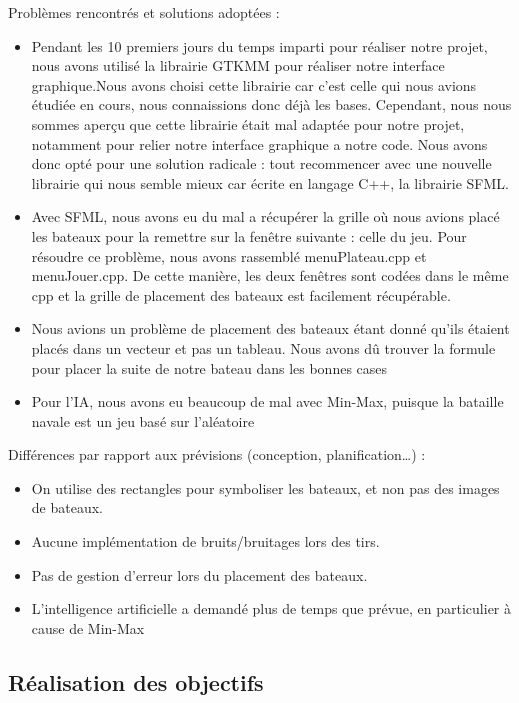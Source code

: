 \documentclass[a4paper,oneside]{article}
\begin{document}
Problèmes rencontrés et solutions adoptées :
\begin{itemize}

\item Pendant les 10 premiers jours du temps imparti pour réaliser notre projet, nous avons utilisé la librairie GTKMM pour réaliser notre interface graphique.Nous avons choisi cette librairie car c'est celle qui nous avions étudiée en cours, nous connaissions donc déjà les bases. Cependant, nous nous sommes aperçu que cette librairie était mal adaptée pour notre projet, notamment pour relier notre interface graphique a notre code. Nous avons donc opté pour une solution radicale : tout recommencer avec une nouvelle librairie qui nous semble mieux car écrite en langage C++, la librairie SFML.
\item Avec SFML, nous avons eu du mal a récupérer la grille où nous avions placé les bateaux pour la remettre sur la fenêtre suivante : celle du jeu. Pour résoudre ce problème, nous avons rassemblé menuPlateau.cpp et menuJouer.cpp. De cette manière, les deux fenêtres sont codées dans le même cpp et la grille de placement des bateaux est facilement récupérable.
\item Nous avions un problème de placement des bateaux étant donné qu'ils étaient placés dans un vecteur et pas un tableau. Nous avons dû trouver la formule pour placer la suite de notre bateau dans les bonnes cases
\item Pour l'IA, nous avons eu beaucoup de mal avec Min-Max, puisque la bataille navale est un jeu basé sur l'aléatoire
\newline
\\
\end{itemize}

Différences par rapport aux prévisions (conception, planification…) :
\begin{itemize}
	\item On utilise des rectangles pour symboliser les bateaux, et non pas des images de bateaux.
	\item Aucune implémentation de bruits/bruitages lors des tirs.
	\item Pas de gestion d'erreur lors du placement des bateaux.
	\item L'intelligence artificielle a demandé plus de temps que prévue, en particulier à cause de Min-Max
\end{itemize}	
	
\subsection{Réalisation des objectifs }
\end{document}
